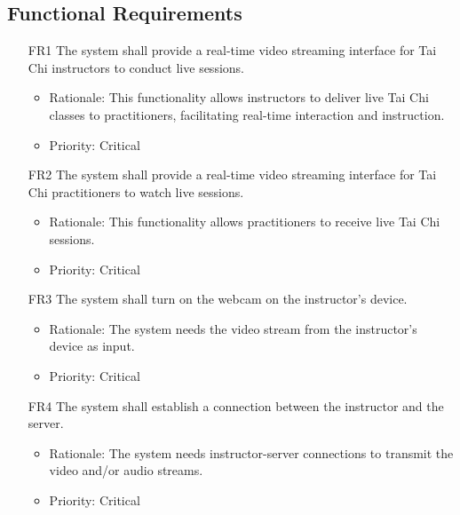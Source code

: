 \documentclass[12pt]{article}
\begin{document}
\subsection{Functional Requirements}
\begin{itemize}
    \item[FR1] The system shall provide a real-time video streaming interface for Tai Chi instructors to conduct live sessions. \label{FR1}
    \begin{itemize}
        \item Rationale: This functionality allows instructors to deliver live Tai Chi classes to practitioners, facilitating real-time interaction and instruction.
        \item Priority: Critical
    \end{itemize}
\end{itemize}
\begin{itemize}
    \item[FR2] The system shall provide a real-time video streaming interface for Tai Chi practitioners to watch live sessions. \label{FR2}
    \begin{itemize}
        \item Rationale: This functionality allows practitioners to receive live Tai Chi sessions.
        \item Priority: Critical
    \end{itemize}
\end{itemize}
\begin{itemize}
    \item[FR3] The system shall turn on the webcam on the instructor’s device. \label{FR3}
    \begin{itemize}
        \item Rationale: The system needs the video stream from the instructor’s device as input.
        \item Priority: Critical
    \end{itemize}
\end{itemize}
\begin{itemize}
    \item[FR4] The system shall establish a connection between the instructor and the server. \label{FR4}
    \begin{itemize}
        \item Rationale: The system needs instructor-server connections to transmit the video and/or audio streams.
        \item Priority: Critical
    \end{itemize}
\end{itemize}
\end{document}
